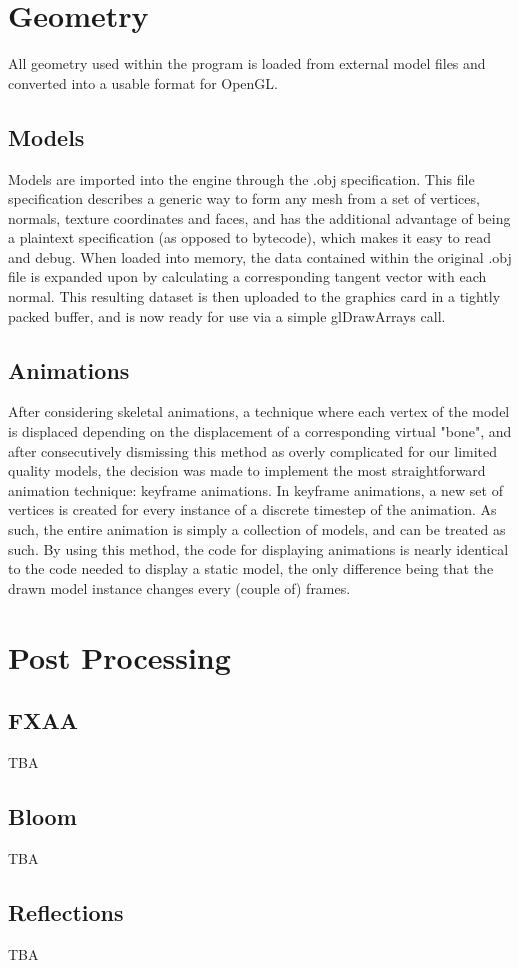 \section{Geometry}
All geometry used within the program is loaded from external model files and converted into a usable format for OpenGL.
\subsection{Models}
Models are imported into the engine through the .obj specification. This file specification describes a generic way to form any mesh from a set of vertices, normals, texture coordinates and faces, and has the additional advantage of being a plaintext specification (as opposed to bytecode), which makes it easy to read and debug. When loaded into memory, the data contained within the original .obj file is expanded upon by calculating a corresponding tangent vector with each normal. This resulting dataset is then uploaded to the graphics card in a tightly packed buffer, and is now ready for use via a simple glDrawArrays call.
\subsection{Animations}
After considering skeletal animations, a technique where each vertex of the model is displaced depending on the displacement of a corresponding virtual "bone", and after consecutively dismissing this method as overly complicated for our limited quality models, the decision was made to implement the most straightforward animation technique: keyframe animations. In keyframe animations, a new set of vertices is created for every instance of a discrete timestep of the animation. As such, the entire animation is simply a collection of models, and can be treated as such. By using this method, the code for displaying animations is nearly identical to the code needed to display a static model, the only difference being that the drawn model instance changes every (couple of) frames.

\section{Post Processing}
\subsection{FXAA}
TBA
\subsection{Bloom}
TBA
\subsection{Reflections}
TBA